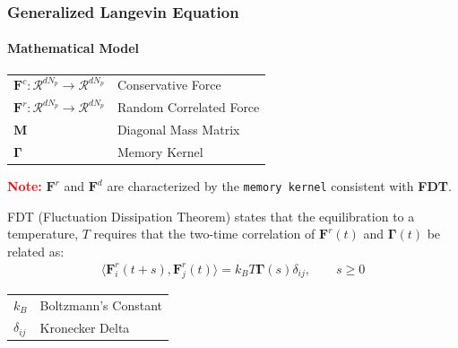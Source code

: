 \documentclass[a4paper,10pt]{beamer}
\newcommand{\BS}[1]{\boldsymbol{#1}}
\begin{document}
	\begin{frame}
		\small
		\frametitle{Generalized Langevin Equation}
		\framesubtitle{Mathematical Model}
		\begin{table}[H]
			\begin{tabular}{l l}
				$\BS{F}^{c} : \mathcal{R}^{d N_{p}} \to \mathcal{R}^{d N_{p}}$ & Conservative Force \\
				$\BS{F}^{r} : \mathcal{R}^{d N_{p}} \to \mathcal{R}^{d N_{p}}$ & Random Correlated Force \\
				$\BS{M}$ & Diagonal Mass Matrix \\
				$\BS{\Gamma}$ & Memory Kernel \\
			\end{tabular}
		\end{table}
		\textbf{\textcolor{red}{Note:}} $\BS{F}^{r}$ and $\BS{F}^{d}$ are characterized by the \texttt{memory kernel} consistent with \textbf{FDT}.
		\begin{theorem}
			FDT (Fluctuation Dissipation Theorem) states that the equilibration to a temperature, $T$ requires that the two-time correlation of $\BS{F}^{r}(t)$ and $\BS{\Gamma}(t)$ be related as:
			\begin{align}
				\langle \BS{F}^{r}_{i}(t+s),\BS{F}^{r}_{j}(t) \rangle = k_{B} T \BS{\Gamma}(s) \delta_{ij}, \qquad s \geq 0
			\end{align}
		\end{theorem}
		\begin{table}
			\begin{tabular}{l l}
				$k_{B}$ & Boltzmann's Constant \\
				$\delta_{ij}$ & Kronecker Delta
			\end{tabular}
		\end{table}
	\end{frame}
	
\end{document}
